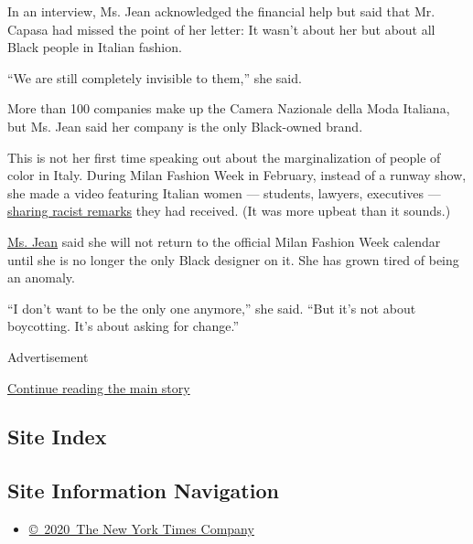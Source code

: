 In an interview, Ms. Jean acknowledged the financial help but said that
Mr. Capasa had missed the point of her letter: It wasn't about her but
about all Black people in Italian fashion.

``We are still completely invisible to them,'' she said.

More than 100 companies make up the Camera Nazionale della Moda
Italiana, but Ms. Jean said her company is the only Black-owned brand.

This is not her first time speaking out about the marginalization of
people of color in Italy. During Milan Fashion Week in February, instead
of a runway show, she made a video featuring Italian women --- students,
lawyers, executives ---
\href{https://www.youtube.com/watch?v=ykhRrN0r5NI}{sharing racist
remarks} they had received. (It was more upbeat than it sounds.)

\href{https://www.nytimes.com/2013/09/24/fashion/Giorgio-Armani-Gives-Young-Designer-a-Hand.html?searchResultPosition=20}{Ms.
Jean} said she will not return to the official Milan Fashion Week
calendar until she is no longer the only Black designer on it. She has
grown tired of being an anomaly.

``I don't want to be the only one anymore,'' she said. ``But it's not
about boycotting. It's about asking for change.''

Advertisement

\protect\hyperlink{after-bottom}{Continue reading the main story}

\hypertarget{site-index}{%
\subsection{Site Index}\label{site-index}}

\hypertarget{site-information-navigation}{%
\subsection{Site Information
Navigation}\label{site-information-navigation}}

\begin{itemize}
\tightlist
\item
  \href{https://help.nytimes.com/hc/en-us/articles/115014792127-Copyright-notice}{©~2020~The
  New York Times Company}
\end{itemize}

